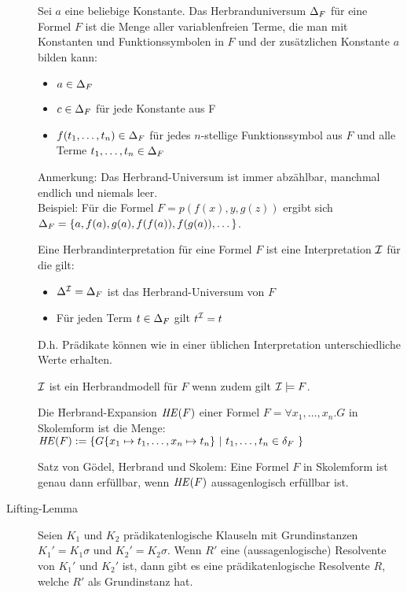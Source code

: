 \begin{description}
            Sei $a$ eine beliebige Konstante. Das Herbranduniversum $\Delta_{F}$ für eine Formel $F$ ist die Menge aller variablenfreien Terme, die man mit Konstanten und Funktionssymbolen in $F$ und der zusätzlichen Konstante $a$ bilden kann:
            \begin{itemize}
                \item $a \in \Delta_{F}$
                \item $c \in \Delta_{F}$ für jede Konstante aus F
                \item $f(t_{1}, \dots, t_{n}) \in \Delta_{F}$ für jedes $n$-stellige Funktionssymbol aus $F$ und alle Terme $t_{1}, \dots, t_{n} \in \Delta_{F}$
            \end{itemize}
            Anmerkung: Das Herbrand-Universum ist immer abzählbar, manchmal endlich und niemals leer. \\
            Beispiel: Für die Formel $F = p(f(x), y, g(z))$ ergibt sich $\Delta_{F} = \{a, f(a), g(a), f(f(a)), f(g(a)), \dots \}$.

\newpage
            Eine Herbrandinterpretation für eine Formel $F$ ist eine Interpretation $\mathcal{I}$ für die gilt:
            \begin{itemize}
                \item $\Delta^{\mathcal{I}} = \Delta_{F}$ ist das Herbrand-Universum von $F$
                \item Für jeden Term $t \in \Delta_{F}$ gilt $t^{\mathcal{I}} = t$
            \end{itemize}
            D.h. Prädikate können wie in einer üblichen Interpretation unterschiedliche Werte erhalten.

            $\mathcal{I}$ ist ein Herbrandmodell für $F$ wenn zudem gilt $\mathcal{I} \models F$.

            Die \f{Herbrand-Expansion} $\mathit{HE}(F)$ einer Formel $F = \forall x_{1}, \dots, x_{n}.G$ in Skolemform ist die Menge:
                $\HE(F) := \{ G\{x_{1} \mapsto t_{1}, \dots, x_{n} \mapsto t_{n} \}\ |\ t_{1},\dots,t_{n} \in \delta_{F}\ \}$

            Satz von Gödel, Herbrand und Skolem: Eine Formel $F$ in Skolemform ist genau dann erfüllbar, wenn $\mathit{HE}(F)$ aussagenlogisch erfüllbar ist.

        \item[Lifting-Lemma] Seien $K_{1}$ und $K_{2}$ prädikatenlogische Klauseln mit Grundinstanzen $K_{1}' = K_{1} \sigma$ und $K_{2}' = K_{2} \sigma$. Wenn $R'$ eine (aussagenlogische) Resolvente von $K_{1}'$ und $K_{2}'$ ist, dann gibt es eine prädikatenlogische Resolvente $R$, welche $R'$ als Grundinstanz hat. 


\end{description}
